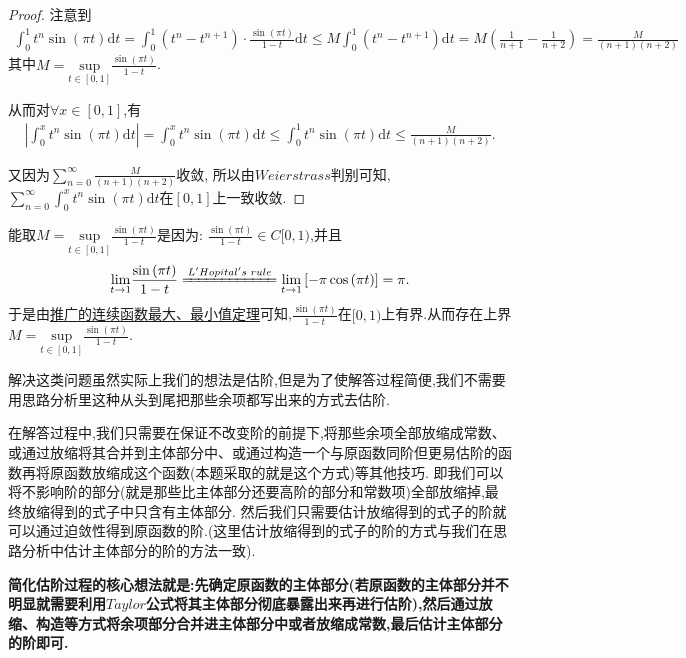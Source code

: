 \documentclass[lang=cn,newtx,10pt,scheme=chinese]{../Template/elegantbook}
\begin{document}
\begin{proof}
{\color{blue}}
注意到\begin{align*}
\int_0^1{t^n\sin \left( \pi t \right) \mathrm{d}t}=\int_0^1{ \left( t^n-t^{n+1} \right) \cdot \frac{\sin \left( \pi t \right)}{1-t}  \mathrm{d}t}\leqslant M\int_0^1{\left( t^n-t^{n+1} \right)}\mathrm{d}t=M\left( \frac{1}{n+1}-\frac{1}{n+2} \right) =\frac{M}{\left( n+1 \right) \left( n+2 \right)}
\end{align*}
其中$M=\underset{t\in \left[ 0,1 \right]}{\mathrm{sup}}\frac{\sin \left( \pi t \right)}{1-t}$.

从而对$\forall x\in[0,1]$,有\begin{align*}
\left| \int_0^x{t^n\sin \left( \pi t \right) \mathrm{d}t} \right|=\int_0^x{t^n\sin \left( \pi t \right) \mathrm{d}t}\leqslant \int_0^1{t^n\sin \left( \pi t \right) \mathrm{d}t}\leqslant \frac{M}{\left( n+1 \right) \left( n+2 \right)}.
\end{align*}



又因为$\sum_{n=0}^{\infty}{\frac{M}{\left( n+1 \right) \left( n+2 \right)}}$收敛,
所以由$Weierstrass$判别可知,$\sum_{n=0}^{\infty}{\int_0^x{t^n\sin \left( \pi t \right) \mathrm{d}t}}$在$\left[ 0,1 \right] $上一致收敛.

\end{proof}
\begin{remark}
能取$M=\underset{t\in \left[ 0,1 \right]}{\mathrm{sup}}\frac{\sin \left( \pi t \right)}{1-t}$是因为:
$\frac{\sin \left( \pi t \right)}{1-t}\in C[0,1)$,并且
\begin{align*}
\underset{t\rightarrow 1}{\lim}\frac{\sin \left( \pi t \right)}{1-t}\xlongequal{L'Hopital's\,\,rule}\underset{t\rightarrow 1}{\lim}\left[ -\pi \cos \left( \pi t \right) \right] =\pi .
\end{align*}
于是由\hyperlink{label}{推广的连续函数最大、最小值定理}可知,$\frac{\sin \left( \pi t \right)}{1-t}$在$[0,1)$上有界.从而存在上界$M=\underset{t\in \left[ 0,1 \right]}{\mathrm{sup}}\frac{\sin \left( \pi t \right)}{1-t}$.
\end{remark}
\begin{remark}
解决这类问题虽然实际上我们的想法是估阶,但是为了使解答过程简便,我们不需要用思路分析里这种从头到尾把那些余项都写出来的方式去估阶.

在解答过程中,我们只需要在保证不改变阶的前提下,将那些余项全部放缩成常数、或通过放缩将其合并到主体部分中、或通过构造一个与原函数同阶但更易估阶的函数再将原函数放缩成这个函数(本题采取的就是这个方式)等其他技巧.
即我们可以将不影响阶的部分(就是那些比主体部分还要高阶的部分和常数项)全部放缩掉,最终放缩得到的式子中只含有主体部分.
然后我们只需要估计放缩得到的式子的阶就可以通过迫敛性得到原函数的阶.(这里估计放缩得到的式子的阶的方式与我们在思路分析中估计主体部分的阶的方法一致).
\end{remark}
\begin{conclusion}\label{简化估阶过程的核心想法}
\textbf{简化估阶过程的核心想法就是:先确定原函数的主体部分(若原函数的主体部分并不明显就需要利用$Taylor$公式将其主体部分彻底暴露出来再进行估阶),然后通过放缩、构造等方式将余项部分合并进主体部分中或者放缩成常数,最后估计主体部分的阶即可.}
\end{conclusion}
\end{document}
